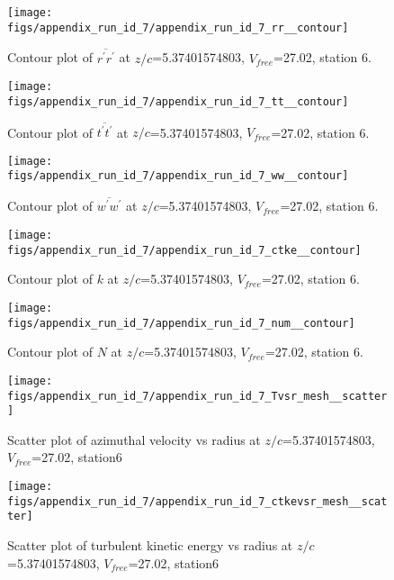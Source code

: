\begin{figure}[H]
\centering
\texttt{[image: figs/appendix\_run\_id\_7/appendix\_run\_id\_7\_rr\_\_contour]}
\caption{Contour plot of $\overline{r^\prime r^\prime}$ at $z/c$=5.37401574803, $V_{free}$=27.02, station 6.}
\label{fig:appendix_run_id_7_rr__contour}
\end{figure}


\begin{figure}[H]
\centering
\texttt{[image: figs/appendix\_run\_id\_7/appendix\_run\_id\_7\_tt\_\_contour]}
\caption{Contour plot of $\overline{t^\prime t^\prime}$ at $z/c$=5.37401574803, $V_{free}$=27.02, station 6.}
\label{fig:appendix_run_id_7_tt__contour}
\end{figure}


\begin{figure}[H]
\centering
\texttt{[image: figs/appendix\_run\_id\_7/appendix\_run\_id\_7\_ww\_\_contour]}
\caption{Contour plot of $\overline{w^\prime w^\prime}$ at $z/c$=5.37401574803, $V_{free}$=27.02, station 6.}
\label{fig:appendix_run_id_7_ww__contour}
\end{figure}


\begin{figure}[H]
\centering
\texttt{[image: figs/appendix\_run\_id\_7/appendix\_run\_id\_7\_ctke\_\_contour]}
\caption{Contour plot of $k$ at $z/c$=5.37401574803, $V_{free}$=27.02, station 6.}
\label{fig:appendix_run_id_7_ctke__contour}
\end{figure}


\begin{figure}[H]
\centering
\texttt{[image: figs/appendix\_run\_id\_7/appendix\_run\_id\_7\_num\_\_contour]}
\caption{Contour plot of $N$ at $z/c$=5.37401574803, $V_{free}$=27.02, station 6.}
\label{fig:appendix_run_id_7_num__contour}
\end{figure}


\begin{figure}[H]
\centering
\texttt{[image: figs/appendix\_run\_id\_7/appendix\_run\_id\_7\_Tvsr\_mesh\_\_scatter]}
\caption{Scatter plot of azimuthal velocity vs radius at $z/c$=5.37401574803, $V_{free}$=27.02, station6}
\label{fig:appendix_run_id_7_Tvsr_mesh__scatter}
\end{figure}


\begin{figure}[H]
\centering
\texttt{[image: figs/appendix\_run\_id\_7/appendix\_run\_id\_7\_ctkevsr\_mesh\_\_scatter]}
\caption{Scatter plot of turbulent kinetic energy vs radius at $z/c$=5.37401574803, $V_{free}$=27.02, station6}
\label{fig:appendix_run_id_7_ctkevsr_mesh__scatter}
\end{figure}


